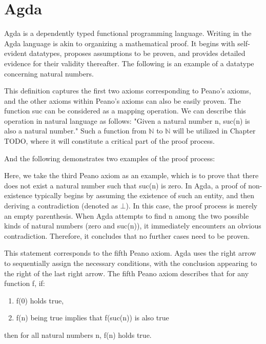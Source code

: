 \section{Agda}

Agda is a dependently typed functional programming language.
Writing in the Agda language is akin to organizing a mathematical proof. It begins with self-evident datatypes, proposes assumptions to be proven, and provides detailed evidence for their validity thereafter.
The following is an example of a datatype concerning natural numbers.



This definition captures the first two axioms corresponding to Peano's axioms, and the other axioms within Peano's axioms can also be easily proven. 
The function suc can be considered as a mapping operation. 
We can describe this operation in natural language as follows: 
"Given a natural number n, suc(n) is also a natural number." 
Such a function from $\mathbb{N}$ to $\mathbb{N}$ will be utilized in Chapter {TODO}, where it will constitute a critical part of the proof process.

And the following demonstrates two examples of the proof process:



Here, we take the third Peano axiom as an example, which is to prove that there does not exist a natural number such that suc(n) is zero. 
In Agda, a proof of non-existence typically begins by assuming the existence of such an entity, and then deriving a contradiction (denoted as $\bot$). 
In this case, the proof process is merely an empty parenthesis.
When Agda attempts to find n among the two possible kinds of natural numbers (zero and suc(n)), it immediately encounters an obvious contradiction. 
Therefore, it concludes that no further cases need to be proven.


This statement corresponds to the fifth Peano axiom. 
Agda uses the right arrow to sequentially assign the necessary conditions, with the conclusion appearing to the right of the last right arrow. 
The fifth Peano axiom describes that for any function f, if:
\begin{enumerate}[1.]
\item f(0) holds true,
\item f(n) being true implies that f(suc(n)) is also true
\end{enumerate}
then for all natural numbers n, f(n) holds true.

